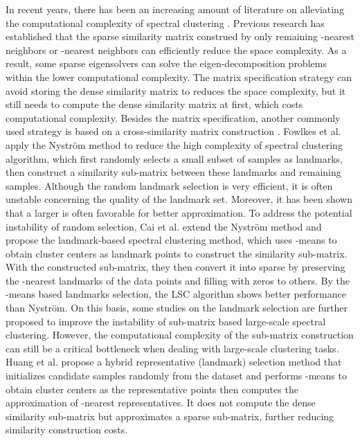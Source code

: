 \documentclass[a4paper,fleqn]{cas-dc}
\begin{document}
In recent years, there has been an increasing amount of literature on alleviating the computational complexity of spectral clustering \cite{fowlkes2004spectral,cai2014large,li2015superpixel,bouneffouf2015sampling,zhang2016sampling,ye2018large,huang2019ultra,li2020hubness}.
Previous research \cite{chen2010parallel} has established that the sparse similarity matrix construed by only remaining -nearest neighbors or -nearest neighbors can efficiently reduce the space complexity. As a result, some sparse eigensolvers can solve the eigen-decomposition problems within the lower computational complexity.
The matrix specification strategy can avoid storing the dense similarity matrix to reduces the space complexity, but it still needs to compute the dense similarity matrix at first, which costs  computational complexity.
Besides the matrix specification, another commonly used strategy is based on a cross-similarity matrix construction \cite{fowlkes2004spectral, cai2014large, li2015superpixel, ye2018large,li2020hubness,huang2019ultra}.
Fowlkes et al. \cite{fowlkes2004spectral} apply the Nystr{\"{o}}m method to reduce the high complexity of spectral clustering algorithm, which first randomly selects a small subset of samples as landmarks, then construct a similarity sub-matrix between these landmarks and remaining samples.
Although the random landmark selection is very efficient, it is often unstable concerning the quality of the landmark set.
Moreover, it has been shown that a larger  is often favorable for better approximation. 
To address the potential instability of random selection, Cai et al. \cite{cai2014large} extend the Nystr{\"{o}}m method and propose the landmark-based spectral clustering method, which uses -means to obtain  cluster centers as  landmark points to construct the similarity sub-matrix.
With the constructed  sub-matrix, they then convert it into sparse by preserving the -nearest landmarks of the data points and filling with zeros to others.
By the -means based landmarks selection, the LSC algorithm shows better performance than Nystr\"{o}m.
On this basis, some studies \cite{zhang2008improved,bouneffouf2015sampling,zhang2016sampling,rafailidis2017landmark,ye2018large, li2020hubness} on the landmark selection are further proposed to improve the instability of sub-matrix based large-scale spectral clustering.
However, the computational complexity of the sub-matrix construction can still be a critical bottleneck when dealing with large-scale clustering tasks.
Huang et al. \cite{huang2019ultra} propose a hybrid representative (landmark) selection method that initializes candidate samples randomly from the dataset and performs -means to obtain  cluster centers as the representative points then computes the approximation of -nearest representatives. It does not compute the dense similarity sub-matrix but approximates a sparse sub-matrix, further reducing similarity construction costs.
\end{document}

